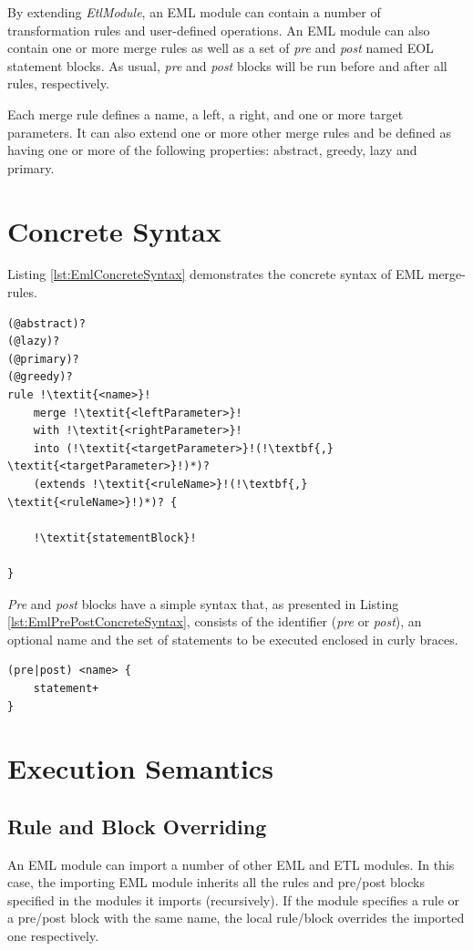 By extending \emph{EtlModule}, an EML module can contain a number of transformation rules and user-defined operations. An EML module can also contain one or more merge rules as well as a set of \emph{pre} and \emph{post} named EOL statement blocks. As usual, \emph{pre} and \emph{post} blocks will be run before and after all rules, respectively.

Each merge rule defines a name, a left, a right, and one or more target parameters. It can also extend one or more other merge rules and be defined as having one or more of the following properties: abstract, greedy, lazy and primary.

\section{Concrete Syntax}

Listing \ref{lst:EmlConcreteSyntax} demonstrates the concrete syntax of EML merge-rules.

\begin{lstlisting}[caption=Concrete syntax of an EML merge-rule, label=lst:EmlConcreteSyntax, language=EML, escapechar=!]
(@abstract)?
(@lazy)?
(@primary)?
(@greedy)?
rule !\textit{<name>}!
	merge !\textit{<leftParameter>}!
	with !\textit{<rightParameter>}!
	into (!\textit{<targetParameter>}!(!\textbf{,} \textit{<targetParameter>}!)*)?
	(extends !\textit{<ruleName>}!(!\textbf{,} \textit{<ruleName>}!)*)? {

	!\textit{statementBlock}!

}
\end{lstlisting}

\emph{Pre} and \emph{post} blocks have a simple syntax that, as presented in Listing \ref{lst:EmlPrePostConcreteSyntax}, consists of the identifier (\emph{pre} or \emph{post}), an optional name and the set of statements to be executed enclosed in curly braces.

\begin{lstlisting}[caption=Concrete Syntax of Pre and Post blocks, label=lst:EmlPrePostConcreteSyntax, language=EML]
(pre|post) <name> {
	statement+
}
\end{lstlisting}

\section{Execution Semantics}

\subsection{Rule and Block Overriding}
An EML module can import a number of other EML and ETL modules. In this case, the importing EML module inherits all the rules and pre/post blocks specified in the modules it imports (recursively). If the module specifies a rule or a pre/post block with the same name, the local rule/block overrides the imported one respectively.

